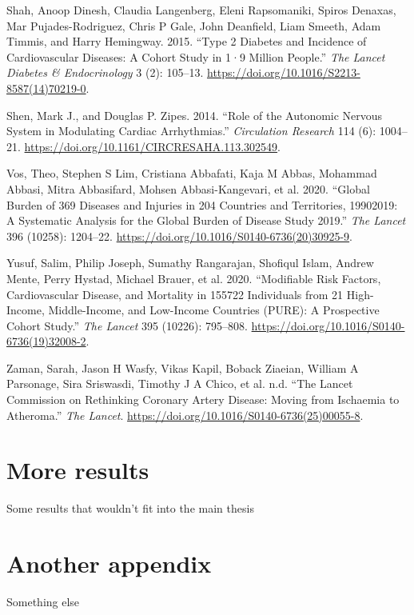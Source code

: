 \documentclass[
  a4paper,
  headsepline=true,
  open=any]{scrbook}
\newlength{\cslhangindent}
\newlength{\cslentryspacingunit} %
\newenvironment{CSLReferences}[2] %
 {%
  \setlength{\parindent}{0pt}
  \ifodd #1
  \let\oldpar\par
  \def\par{\hangindent=\cslhangindent\oldpar}
  \fi
  \setlength{\parskip}{#2\cslentryspacingunit}
 }%
 {}
\begin{document}
\begin{CSLReferences}{1}{0}
\leavevmode{}%
Shah, Anoop Dinesh, Claudia Langenberg, Eleni Rapsomaniki, Spiros
Denaxas, Mar Pujades-Rodriguez, Chris P Gale, John Deanfield, Liam
Smeeth, Adam Timmis, and Harry Hemingway. 2015. {``Type 2 Diabetes and
Incidence of Cardiovascular Diseases: A Cohort Study in 1·9 Million
People.''} \emph{The Lancet Diabetes \& Endocrinology} 3 (2): 105--13.
\url{https://doi.org/10.1016/S2213-8587(14)70219-0}.

\leavevmode{}%
Shen, Mark J., and Douglas P. Zipes. 2014. {``Role of the Autonomic
Nervous System in Modulating Cardiac Arrhythmias.''} \emph{Circulation
Research} 114 (6): 1004--21.
\url{https://doi.org/10.1161/CIRCRESAHA.113.302549}.

\leavevmode{}%
Vos, Theo, Stephen S Lim, Cristiana Abbafati, Kaja M Abbas, Mohammad
Abbasi, Mitra Abbasifard, Mohsen Abbasi-Kangevari, et al. 2020.
{``Global Burden of 369 Diseases and Injuries in 204 Countries and
Territories, 1990{\textendash}2019: A Systematic Analysis for the Global
Burden of Disease Study 2019.''} \emph{The Lancet} 396 (10258):
1204--22. \url{https://doi.org/10.1016/S0140-6736(20)30925-9}.

\leavevmode{}%
Yusuf, Salim, Philip Joseph, Sumathy Rangarajan, Shofiqul Islam, Andrew
Mente, Perry Hystad, Michael Brauer, et al. 2020. {``Modifiable Risk
Factors, Cardiovascular Disease, and Mortality in 155{\hphantom{,}}722
Individuals from 21 High-Income, Middle-Income, and Low-Income Countries
(PURE): A Prospective Cohort Study.''} \emph{The Lancet} 395 (10226):
795--808. \url{https://doi.org/10.1016/S0140-6736(19)32008-2}.

\leavevmode{}%
Zaman, Sarah, Jason H Wasfy, Vikas Kapil, Boback Ziaeian, William A
Parsonage, Sira Sriswasdi, Timothy J A Chico, et al. n.d. {``The Lancet
Commission on Rethinking Coronary Artery Disease: Moving from Ischaemia
to Atheroma.''} \emph{The Lancet}.
\url{https://doi.org/10.1016/S0140-6736(25)00055-8}.

\end{CSLReferences}

\cleardoublepage
{}
{}
\appendix

\hypertarget{sec-more-results}{%
\chapter{More results}\label{sec-more-results}}

Some results that wouldn't fit into the main thesis

\hypertarget{another-appendix}{%
\chapter{Another appendix}\label{another-appendix}}

Something else


\backmatter
\end{document}
